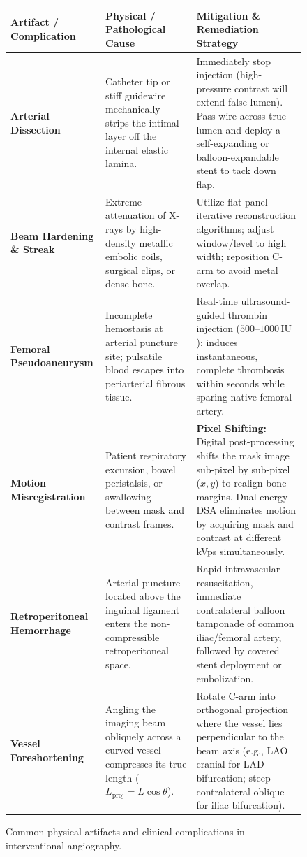 \documentclass[11pt,a4paper]{article}
\begin{document}
\begin{figure}[htbp]
\centering
\setlength{\tabcolsep}{4pt}
\begin{tabular}{p{3.8cm}p{5.5cm}p{5.5cm}}
\toprule
\textbf{Artifact / Complication} & \textbf{Physical / Pathological Cause} & \textbf{Mitigation \& Remediation Strategy} \\
\midrule
\textbf{Arterial Dissection} & Catheter tip or stiff guidewire mechanically strips the intimal layer off the internal elastic lamina. & Immediately stop injection (high-pressure contrast will extend false lumen). Pass wire across true lumen and deploy a self-expanding or balloon-expandable stent to tack down flap. \\
\addlinespace
\textbf{Beam Hardening \& Streak} & Extreme attenuation of X-rays by high-density metallic embolic coils, surgical clips, or dense bone. & Utilize flat-panel iterative reconstruction algorithms; adjust window/level to high width; reposition C-arm to avoid metal overlap. \\
\addlinespace
\textbf{Femoral Pseudoaneurysm} & Incomplete hemostasis at arterial puncture site; pulsatile blood escapes into periarterial fibrous tissue. & Real-time ultrasound-guided thrombin injection ($500\text{--}1000\,\text{IU}$): induces instantaneous, complete thrombosis within seconds while sparing native femoral artery. \\
\addlinespace
\textbf{Motion Misregistration} & Patient respiratory excursion, bowel peristalsis, or swallowing between mask and contrast frames. & \textbf{Pixel Shifting:} Digital post-processing shifts the mask image sub-pixel by sub-pixel ($x, y$) to realign bone margins. Dual-energy DSA eliminates motion by acquiring mask and contrast at different kVps simultaneously. \\
\addlinespace
\textbf{Retroperitoneal Hemorrhage} & Arterial puncture located above the inguinal ligament enters the non-compressible retroperitoneal space. & Rapid intravascular resuscitation, immediate contralateral balloon tamponade of common iliac/femoral artery, followed by covered stent deployment or embolization. \\
\addlinespace
\textbf{Vessel Foreshortening} & Angling the imaging beam obliquely across a curved vessel compresses its true length ($L_{\text{proj}} = L \cos\theta$). & Rotate C-arm into orthogonal projection where the vessel lies perpendicular to the beam axis (e.g., LAO cranial for LAD bifurcation; steep contralateral oblique for iliac bifurcation). \\
\bottomrule
\end{tabular}
\caption{Common physical artifacts and clinical complications in interventional angiography.}
\label{tab:artifacts_complications}
\end{figure}
\end{document}
